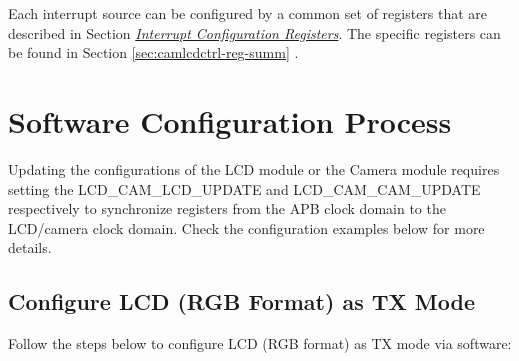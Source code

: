 \documentclass[main\_\_EN.tex]{subfiles}
\begin{document}
Each interrupt source can be configured by a common set of registers that are described in Section \hyperref[interrupt-config-registers]{\textit{Interrupt Configuration Registers}}. The specific registers can be found in Section \ref{sec:camlcdctrl-reg-summ} \textit{}.

\section{Software Configuration Process}
\begin{tiplisting}
Updating the configurations of the LCD module or the Camera module requires setting the LCD\_CAM\_LCD\_UPDATE and LCD\_CAM\_CAM\_UPDATE respectively to synchronize registers from the APB clock domain to the LCD/camera clock domain. Check the configuration examples below for more details.
\end{tiplisting}
\vspace{-1em}
\subsection{Configure LCD (RGB Format) as TX Mode}

Follow the steps below to configure LCD (RGB format) as TX mode via software:
\end{document}
